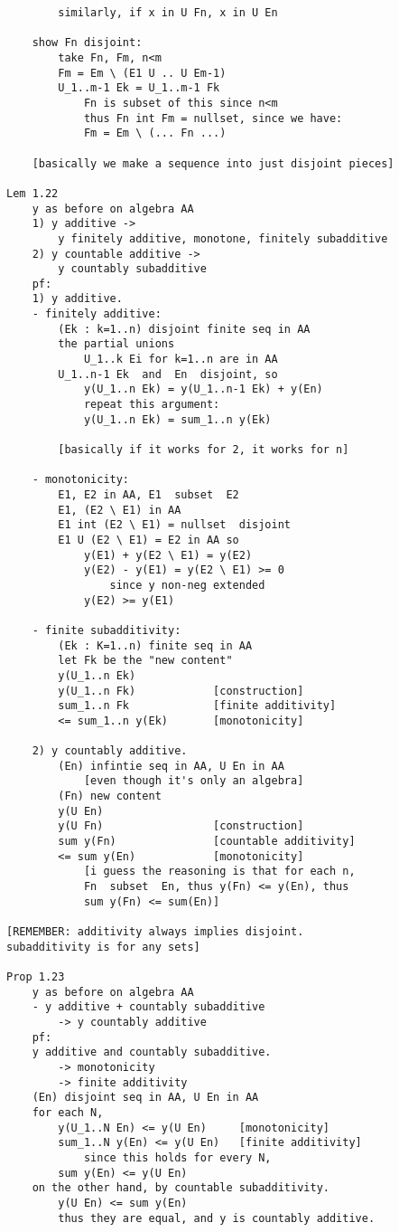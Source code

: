 \documentclass{article}
\begin{document}
\begin{flushleft}
\begin{verbatim}
        similarly, if x in U Fn, x in U En 

    show Fn disjoint: 
        take Fn, Fm, n<m 
        Fm = Em \ (E1 U .. U Em-1)
        U_1..m-1 Ek = U_1..m-1 Fk
            Fn is subset of this since n<m
            thus Fn int Fm = nullset, since we have:
            Fm = Em \ (... Fn ...)
    
    [basically we make a sequence into just disjoint pieces]

Lem 1.22
    y as before on algebra AA 
    1) y additive -> 
        y finitely additive, monotone, finitely subadditive
    2) y countable additive ->
        y countably subadditive 
    pf:
    1) y additive.
    - finitely additive:
        (Ek : k=1..n) disjoint finite seq in AA 
        the partial unions 
            U_1..k Ei for k=1..n are in AA
        U_1..n-1 Ek  and  En  disjoint, so 
            y(U_1..n Ek) = y(U_1..n-1 Ek) + y(En)
            repeat this argument:
            y(U_1..n Ek) = sum_1..n y(Ek)
        
        [basically if it works for 2, it works for n]

    - monotonicity:
        E1, E2 in AA, E1  subset  E2 
        E1, (E2 \ E1) in AA 
        E1 int (E2 \ E1) = nullset  disjoint 
        E1 U (E2 \ E1) = E2 in AA so 
            y(E1) + y(E2 \ E1) = y(E2)
            y(E2) - y(E1) = y(E2 \ E1) >= 0 
                since y non-neg extended 
            y(E2) >= y(E1)

    - finite subadditivity:
        (Ek : K=1..n) finite seq in AA 
        let Fk be the "new content"
        y(U_1..n Ek)
        y(U_1..n Fk)            [construction]
        sum_1..n Fk             [finite additivity]
        <= sum_1..n y(Ek)       [monotonicity]

    2) y countably additive. 
        (En) infintie seq in AA, U En in AA 
            [even though it's only an algebra]
        (Fn) new content 
        y(U En)
        y(U Fn)                 [construction]
        sum y(Fn)               [countable additivity]
        <= sum y(En)            [monotonicity]
            [i guess the reasoning is that for each n,
            Fn  subset  En, thus y(Fn) <= y(En), thus
            sum y(Fn) <= sum(En)]

[REMEMBER: additivity always implies disjoint. 
subadditivity is for any sets]

Prop 1.23 
    y as before on algebra AA 
    - y additive + countably subadditive 
        -> y countably additive 
    pf:
    y additive and countably subadditive.
        -> monotonicity
        -> finite additivity 
    (En) disjoint seq in AA, U En in AA 
    for each N, 
        y(U_1..N En) <= y(U En)     [monotonicity]
        sum_1..N y(En) <= y(U En)   [finite additivity] 
            since this holds for every N,
        sum y(En) <= y(U En) 
    on the other hand, by countable subadditivity.
        y(U En) <= sum y(En)
        thus they are equal, and y is countably additive.


\end{verbatim}
\end{flushleft}
\end{document}

